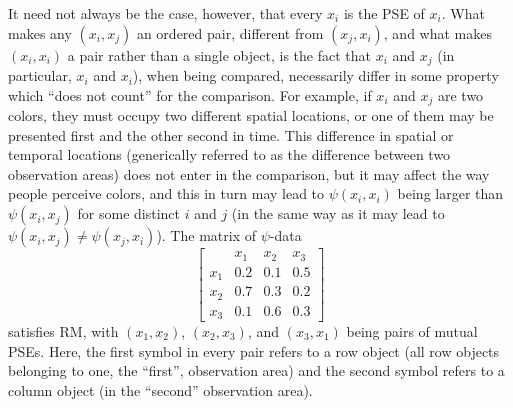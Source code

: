 \documentclass[nojss]{jss}
\begin{document}
It need not always be the case, however, that every $x_{i}$ is the PSE of $x_{i}$.
What makes any $\left(x_{i},x_{j}\right)$ an ordered pair, different from $\left(x_{j},x_{i}\right)$,
and what makes $\left(x_{i},x_{i}\right)$ a pair rather than a single
object, is the fact that $x_{i}$ and $x_{j}$ (in particular, $x_{i}$ and $x_{i}$),
when being compared, necessarily differ in some property which ``does
not count'' for the comparison. For example, if $x_{i}$ and $x_{j}$
are two colors, they must occupy two different spatial locations,
or one of them may be presented first and the other second in time.
This difference in spatial or temporal locations (generically referred to as the difference between two observation areas) 
does not enter in the comparison, but it may affect the way people perceive colors, and
this in turn may lead to $\psi\left(x_{i},x_{i}\right)$ being larger
than $\psi\left(x_{i},x_{j}\right)$ for some distinct $i$ and $j$
(in the same way as it may lead to $\psi\left(x_{i},x_{j}\right)\neq\psi\left(x_{j},x_{i}\right)$).
The matrix of $\psi$-data
\[
\left[\begin{array}{cccc}
 & x_{1} & x_{2} & x_{3}\\
x_{1} & 0.2 & 0.1 & 0.5\\
x_{2} & 0.7 & 0.3 & 0.2\\
x_{3} & 0.1 & 0.6 & 0.3\end{array}\right]
\]
satisfies RM, with $\left(x_{1},x_{2}\right)$, $\left(x_{2},x_{3}\right)$,
and $\left(x_{3},x_{1}\right)$ being pairs of mutual PSEs. Here,
the first symbol in every pair refers to a row object (all row objects belonging to one, the ``first'', observation area) 
and the second symbol refers to a column object (in the ``second'' observation area).
\end{document}
